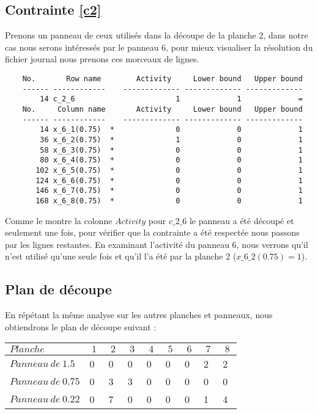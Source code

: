\documentclass{article}[A4]
\begin{document}
\subsection{Contrainte \ref{c2}}
Prenons un panneau de ceux utilisés dans la découpe de la planche 2, dans 
notre cas nous serons intéressés par le panneau 6, pour mieux visualiser 
la résolution du fichier journal nous prenons ces morceaux de lignes.
\begin{verbatim}
	No.       Row name        Activity     Lower bound   Upper bound
	------ ------------    ------------- ------------- -------------
	    14 c_2_6                       1             1             = 
	No.     Column name       Activity     Lower bound   Upper bound
	------ ------------    ------------- ------------- -------------
	    14 x_6_1(0.75)  *              0             0             1 
	    36 x_6_2(0.75)  *              1             0             1 
	    58 x_6_3(0.75)  *              0             0             1 
	    80 x_6_4(0.75)  *              0             0             1 
	   102 x_6_5(0.75)  *              0             0             1 
	   124 x_6_6(0.75)  *              0             0             1 
	   146 x_6_7(0.75)  *              0             0             1 
	   168 x_6_8(0.75)  *              0             0             1 
\end{verbatim}
Comme le montre la colonne $Activity$ pour \texttt{$c\_2\_6$} le 
panneau a été découpé et seulement une fois, pour vérifier que la 
contrainte a été respectée nous passons par les lignes restantes. 
En examinant l'activité du panneau 6, nous verrons qu'il n'est utilisé
qu'une seule fois et qu'il l'a été par la planche 2 
($\texttt{$x\_6\_2(0.75)$} = 1$).
\subsection{Plan de découpe}
En répétant la même analyse sur les autres planches et panneaux, nous
obtiendrons le plan de découpe suivant :
\begin{center}
	\begin{tabular} {| l | l | l | l | l | l | l | l | l |}
		\hline
		$Planche$				&$\ 1 \ $	&$\ 2 \ $	&$\ 3 \ $	&$\ 4 \ $ 	&$\ 5 \ $	&$\ 6 \ $	&$\ 7 \ $	&$\ 8 \ $	\\
		\hline
		$ Panneau\ de\ 1.5 $	&	0		&	0		& 	0		&	0		&	0		&	0		& 	2		&  	2		\\
		\hline
		$ Panneau\ de\ 0.75$	& 	0		&	3 		& 	3		&	0		&	0		&	0		& 	0		&  	0		\\
		\hline
		$ Panneau\ de\ 0.22$ 	& 	0		&	7		& 	0		&	0		&	0		&	0		& 	1		&  	4		\\
		\hline
	\end{tabular}
\end{center}
\end{document}
